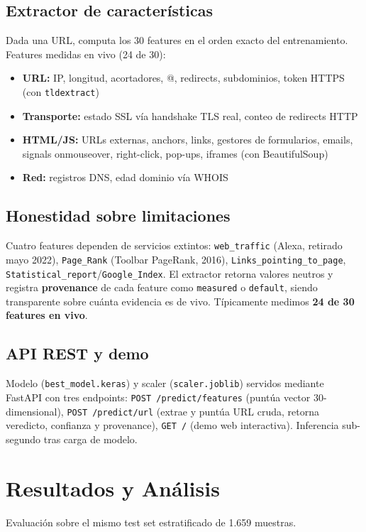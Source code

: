 \documentclass[conference]{IEEEtran}
\begin{document}
\subsection{Extractor de características}
Dada una URL, computa los 30 features en el orden exacto del entrenamiento. Features medidas en vivo (24 de 30):

\begin{itemize}
  \item \textbf{URL:} IP, longitud, acortadores, @, redirects, subdominios, token HTTPS (con \texttt{tldextract})
  \item \textbf{Transporte:} estado SSL vía handshake TLS real, conteo de redirects HTTP
  \item \textbf{HTML/JS:} URLs externas, anchors, links, gestores de formularios, emails, signals onmouseover, right-click, pop-ups, iframes (con BeautifulSoup)
  \item \textbf{Red:} registros DNS, edad dominio vía WHOIS
\end{itemize}

\subsection{Honestidad sobre limitaciones}
Cuatro features dependen de servicios extintos: \texttt{web\_traffic} (Alexa, retirado mayo 2022), \texttt{Page\_Rank} (Toolbar PageRank, 2016), \texttt{Links\_pointing\_to\_page}, \texttt{Statistical\_report}/\texttt{Google\_Index}. El extractor retorna valores neutros y registra \textbf{provenance} de cada feature como \texttt{measured} o \texttt{default}, siendo transparente sobre cuánta evidencia es de vivo. Típicamente medimos \textbf{24 de 30 features en vivo}.

\subsection{API REST y demo}
Modelo (\texttt{best\_model.keras}) y scaler (\texttt{scaler.joblib}) servidos mediante FastAPI con tres endpoints: \texttt{POST /predict/features} (puntúa vector 30-dimensional), \texttt{POST /predict/url} (extrae y puntúa URL cruda, retorna veredicto, confianza y provenance), \texttt{GET /} (demo web interactiva). Inferencia sub-segundo tras carga de modelo.

\section{Resultados y Análisis}
Evaluación sobre el mismo test set estratificado de 1.659 muestras.
\end{document}
